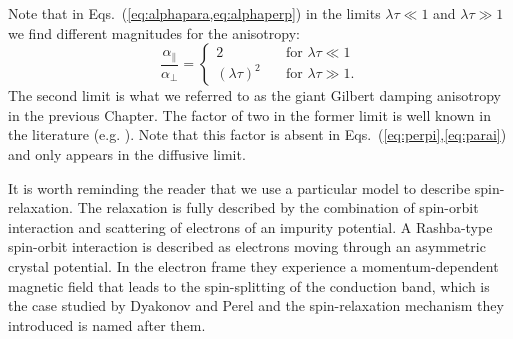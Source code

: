 Note that in Eqs.~(\ref{eq:alphapara,eq:alphaperp}) in the limits $\lambda\tau\ll 1$ and $\lambda\tau\gg1$ we find different magnitudes for the anisotropy:
\begin{equation}
	\frac{\alpha_{\parallel}}{\alpha_{\perp}} = \begin{cases}
    	2 
        	& \quad \text{for } \lambda\tau\ll 1\\
        (\lambda\tau)^2
        	& \quad \text{for } \lambda\tau\gg 1.
    \end{cases}
\end{equation}
The second limit is what we referred to as the giant Gilbert damping anisotropy in the previous Chapter. The factor of two in the former limit is well known in the literature (e.g. \cite{DYAKONOV1986, aronov_spin_1983, averkiev_spin_2002, burkov_theory_2004}). Note that this factor is absent in Eqs.~(\ref{eq:perpi},\ref{eq:parai}) and only appears in the diffusive limit. 

It is worth reminding the reader that we use a particular model to describe spin-relaxation. The relaxation is fully described by the combination of spin-orbit interaction and scattering of electrons of an impurity potential. A Rashba-type spin-orbit interaction is described as electrons moving through an asymmetric crystal potential. In the electron frame they experience a momentum-dependent magnetic field that leads to the spin-splitting of the conduction band, which is the case studied by Dyakonov and Perel \cite{dyakonov1972spin, DYAKONOV1986} and the spin-relaxation mechanism they introduced is named after them. 

